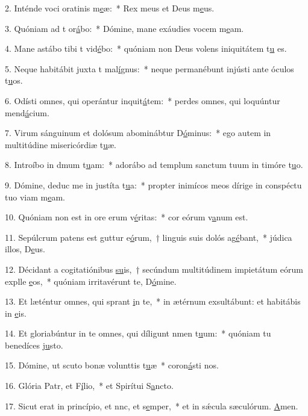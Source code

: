 2. Inténde voci oratinis m\uline{e}æ:~* Rex meus et Deus m\uline{e}us.\par 
3. Quóniam ad t or\uline{á}bo:~* Dómine, mane exáudies vocem m\uline{e}am.\par 
4. Mane astábo tibi t vid\uline{é}bo:~* quóniam non Deus volens iniquitátem t\uline{u} es.\par 
5. Neque habitábit juxta t mal\uline{í}gnus:~* neque permanébunt injústi ante óculos t\uline{u}os.\par 
6. Odísti omnes, qui operántur inquit\uline{á}tem:~* perdes omnes, qui loquúntur mend\uline{á}cium.\par 
7. Virum sánguinum et dolósum abominábtur D\uline{ó}minus:~* ego autem in multitúdine misericórdiæ t\uline{u}æ.\par 
8. Introíbo in dmum t\uline{u}am:~* adorábo ad templum sanctum tuum in timóre t\uline{u}o.\par 
9. Dómine, deduc me in justíta t\uline{u}a:~* propter inimícos meos dírige in conspéctu tuo viam m\uline{e}am.\par 
10. Quóniam non est in ore erum v\uline{é}ritas:~* cor eórum v\uline{a}num est.\par 
11. Sepúlcrum patens est guttur e\uline{ó}rum,~† linguis suis dolós ag\uline{é}bant,~* júdica illos, D\uline{e}us.\par 
12. Décidant a cogitatiónibus \uline{su}is,~† secúndum multitúdinem impietátum eórum explle \uline{e}os,~* quóniam irritavérunt te, D\uline{ó}mine.\par 
13. Et læténtur omnes, qui sprant \uline{i}n te,~* in ætérnum exsultábunt: et habitábis in \uline{e}is.\par 
14. Et gloriabúntur in te omnes, qui díligunt nmen t\uline{u}um:~* quóniam tu benedíces j\uline{u}sto.\par 
15. Dómine, ut scuto bonæ volunttis t\uline{u}æ~* coron\uline{á}sti nos.\par 
16. Glória Patr, et F\uline{í}lio,~* et Spirítui S\uline{a}ncto.\par 
17. Sicut erat in princípio, et nnc, et s\uline{e}mper,~* et in sǽcula sæculórum. \uline{A}men.\par 
